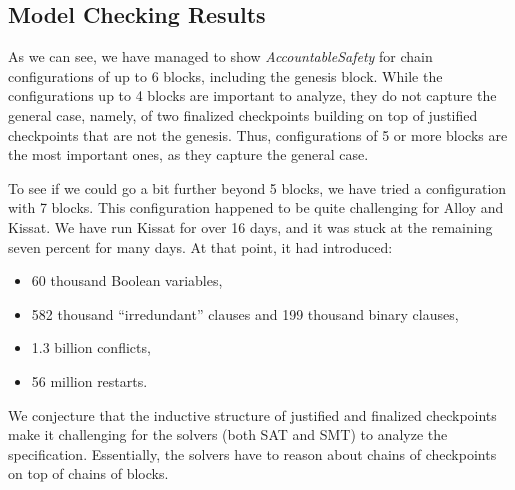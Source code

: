 \subsection{Model Checking Results}\label{sec:alloy-results}

As we can see, we have managed to show \textit{AccountableSafety} for chain
configurations of up to 6 blocks, including the genesis block. While the
configurations up to 4 blocks are important to analyze, they do not capture the
general case, namely, of two finalized checkpoints building on top of justified
checkpoints that are not the genesis. Thus, configurations of 5 or more blocks
are the most important ones, as they capture the general case.

To see if we could go a bit further beyond 5 blocks, we have tried a
configuration with 7 blocks. This configuration happened to be quite challenging
for Alloy and Kissat. We have run Kissat for over 16 days, and it was stuck at
the remaining seven percent for many days. At that point, it had introduced:

\begin{itemize}
  \item 60 thousand Boolean variables,
  \item 582 thousand ``irredundant'' clauses and 199 thousand binary clauses,
  \item 1.3 billion conflicts,
  \item 56 million restarts.
\end{itemize}

We conjecture that the inductive structure of justified and finalized
checkpoints make it challenging for the solvers (both SAT and SMT) to analyze
the specification. Essentially, the solvers have to reason about chains of
checkpoints on top of chains of blocks.

